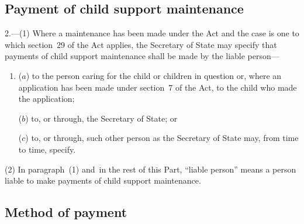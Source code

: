 \documentclass[12pt,a4paper]{article}
\begin{document}
\renewcommand\parthead{--- Part II}

\subsection[2. Payment of child support maintenance]{Payment of child support maintenance}

2.—(1) Where a maintenance 
has been made under the Act and the case is one to which section~29 of the Act applies, the Secretary of State may specify that payments of child support maintenance shall be made by the liable person—
\begin{enumerate}\item[]
($a$) to the person caring for the child or children in question or, where an application has been made under section~7 of the Act, to the child who made the application;

($b$) to, or through, the Secretary of State; or

($c$) to, or through, such other person as the Secretary of State may, from time to time, specify.
\end{enumerate}

(2) In paragraph~(1) and~in the rest of this Part, “liable person” means a person liable to make payments of child support maintenance.


\subsection[3. Method of payment]{Method of payment}
\end{document}
